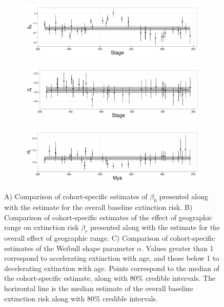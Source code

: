 \documentclass{article}
\begin{document}
\begin{figure}[ht]
  \centering
  \begin{subfigure}[b]{\textwidth}
    \caption{}
    \includegraphics[width = \textwidth,keepaspectratio=true]{figure/intercept_cohort}
    \label{fig:cohort_intercept}
  \end{subfigure}

  \begin{subfigure}[b]{\textwidth}
    \caption{}
    \includegraphics[width = \textwidth,keepaspectratio=true]{figure/range_cohort}
    \label{fig:cohort_range}
  \end{subfigure}
  
  \begin{subfigure}[b]{\textwidth}
    \caption{}
    \includegraphics[width = \textwidth,keepaspectratio=true]{figure/alpha_cohort}
    \label{fig:cohort_alpha}
  \end{subfigure}
  \caption{A) Comparison of cohort-specific estimates of \(\beta_{0}\) presented along with the estimate for the overall baseline extinction risk. B) Comparison of cohort-specific estimates of the effect of geographic range on extinction risk \(\beta_{r}\) presented along with the estimate for the overall effect of geographic range. C) Comparison of cohort-specific estimates of the Weibull shape parameter \(\alpha\). Values greater than 1 correspond to accelerating extinction with age, and those below 1 to decelerating extinction with age. Points correspond to the median of the cohort-specific estimate, along with 80\% credible intervals. The horizontal line is the median estimate of the overall baseline extinction risk along with 80\% credible intervals.}
\end{figure}
\end{document}
